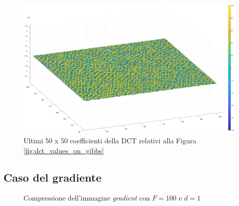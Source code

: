 \begin{figure}
	\centering
	\includegraphics[width=1\linewidth]{figures/last_dct_values.eps}

	\caption{Ultimi 50 x 50 coefficienti della DCT relativi alla Figura \ref{fig:dct_values_on_gibbs}}
	\label{fig:last_dct_values_gibbs}
\end{figure}
\FloatBarrier

\subsection{Caso del gradiente}
\begin{figure}%
	\centering
	\caption{Compressione dell'immagine \textit{gradient} con $F=100$ e $d=1$}%
	\label{fig:gradient}
\end{figure}

